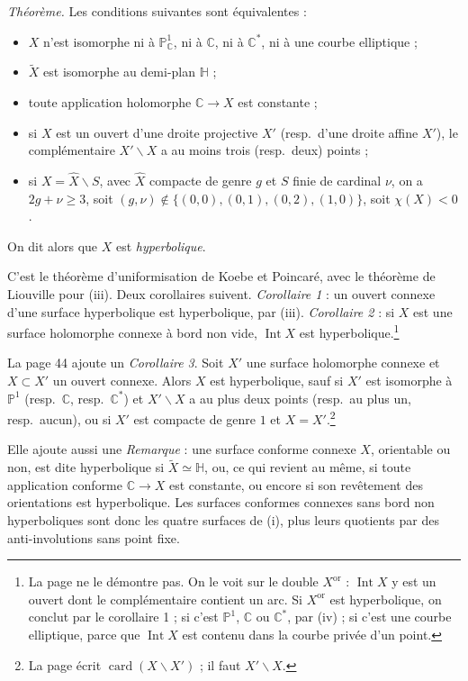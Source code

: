 \documentclass[11pt,a4paper]{article}
\begin{document}
\emph{Théorème.} Les conditions suivantes sont équivalentes :
\begin{itemize}
  \item[(i)] $X$ n'est isomorphe ni à $\mathbb{P}^{1}_{\mathbb{C}}$, ni à
  $\mathbb{C}$, ni à $\mathbb{C}^{*}$, ni à une courbe elliptique ;
  \item[(ii)] $\widetilde{X}$ est isomorphe au demi-plan $\mathbb{H}$ ;
  \item[(iii)] toute application holomorphe $\mathbb{C} \to X$ est constante ;
  \item[(iv)] si $X$ est un ouvert d'une droite projective $X'$ (resp.\ d'une
  droite affine $X'$), le complémentaire $X' \smallsetminus X$ a au moins
  trois (resp.\ deux) points ;
  \item[(v)] si $X = \widehat{X} \smallsetminus S$, avec $\widehat{X}$
  compacte de genre $g$ et $S$ finie de cardinal $\nu$, on a
  $2g + \nu \geqslant 3$, soit $(g,\nu) \notin \{(0,0),(0,1),(0,2),(1,0)\}$,
  soit $\chi(X) < 0$.
\end{itemize}
On dit alors que $X$ est \emph{hyperbolique}.

C'est le théorème d'uniformisation de Koebe et Poincaré, avec le théorème de
Liouville pour (iii). Deux corollaires suivent. \emph{Corollaire 1} : un ouvert
connexe d'une surface hyperbolique est hyperbolique, par (iii).
\emph{Corollaire 2} : si $X$ est une surface holomorphe connexe à bord non
vide, $\operatorname{Int} X$ est hyperbolique.\footnote{La page ne le démontre
pas. On le voit sur le double $X^{\mathrm{or}}$ : $\operatorname{Int} X$ y
est un ouvert dont le complémentaire contient un arc. Si $X^{\mathrm{or}}$ est
hyperbolique, on conclut par le corollaire 1 ; si c'est $\mathbb{P}^{1}$,
$\mathbb{C}$ ou $\mathbb{C}^{*}$, par (iv) ; si c'est une courbe elliptique,
parce que $\operatorname{Int} X$ est contenu dans la courbe privée d'un
point.}

La page 44 ajoute un \emph{Corollaire 3}. Soit $X'$ une surface holomorphe
connexe et $X \subset X'$ un ouvert connexe. Alors $X$ est hyperbolique, sauf
si $X'$ est isomorphe à $\mathbb{P}^{1}$ (resp.\ $\mathbb{C}$, resp.\
$\mathbb{C}^{*}$) et $X' \smallsetminus X$ a au plus deux points (resp.\ au
plus un, resp.\ aucun), ou si $X'$ est compacte de genre $1$ et
$X = X'$.\footnote{La page écrit $\operatorname{card}(X \smallsetminus X')$ ;
il faut $X' \smallsetminus X$.}

Elle ajoute aussi une \emph{Remarque} : une surface conforme connexe $X$,
orientable ou non, est dite hyperbolique si $\widetilde{X} \simeq \mathbb{H}$,
ou, ce qui revient au même, si toute application conforme $\mathbb{C} \to X$
est constante, ou encore si son revêtement des orientations est hyperbolique.
Les surfaces conformes connexes sans bord non hyperboliques sont donc les
quatre surfaces de (i), plus leurs quotients par des anti-involutions sans
point fixe.
\end{document}
